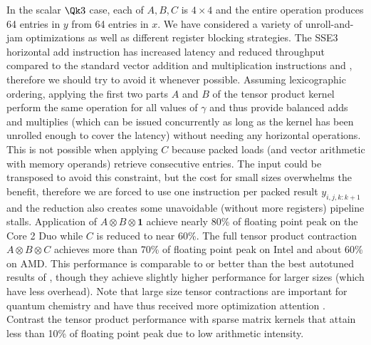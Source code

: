 In the scalar $\Qk 3$ case, each of $A,B,C$ is $4\times 4$ and the entire operation produces 64 entries in $y$ from 64 entries in $x$.
We have considered a variety of unroll-and-jam optimizations as well as different register blocking strategies.
The SSE3 horizontal add instruction  has increased latency and reduced throughput compared to the standard vector addition and multiplication instructions  and , therefore we should try to avoid it whenever possible.
Assuming lexicographic ordering, applying the first two parts $A$ and $B$ of the tensor product kernel perform the same operation for all values of $\gamma$ and thus provide balanced adds and multiplies (which can be issued concurrently as long as the kernel has been unrolled enough to cover the latency) without needing any horizontal operations.
This is not possible when applying $C$ because packed loads (and vector arithmetic with memory operands) retrieve consecutive entries.
The input could be transposed to avoid this constraint, but the cost for small sizes overwhelms the benefit, therefore we are forced to use one  instruction per packed result $y_{i,j,k:k+1}$ and the reduction also creates some unavoidable (without more registers) pipeline stalls.
Application of $A\otimes B\otimes \bm 1$ achieve nearly 80\% of floating point peak on the Core 2 Duo while $C$ is reduced to near 60\%.
The full tensor product contraction $A\otimes B\otimes C$ achieves more than 70\% of floating point peak on Intel and about 60\% on AMD.
This performance is comparable to or better than the best autotuned results of \citet{shin2010speeding}, though they achieve slightly higher performance for larger sizes (which have less overhead).
Note that large size tensor contractions are important for quantum chemistry and have thus received more optimization attention \citep[\eg][]{kaushik2008improving,hirata2003tensor}.
Contrast the tensor product performance with sparse matrix kernels that attain less than 10\% of floating point peak due to low arithmetic intensity.

